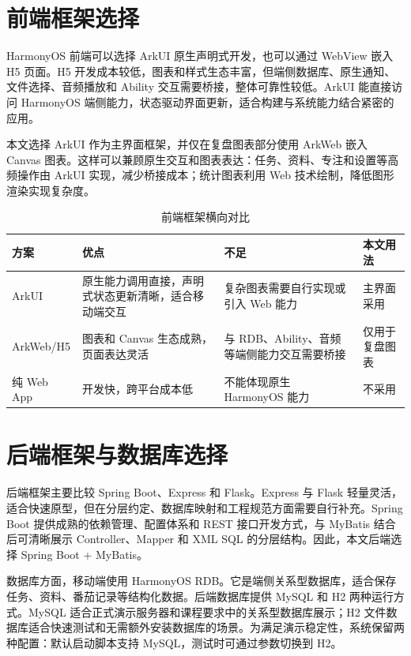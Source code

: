 \section{前端框架选择}

HarmonyOS 前端可以选择 ArkUI 原生声明式开发，也可以通过 WebView 嵌入 H5 页面。H5 开发成本较低，图表和样式生态丰富，但端侧数据库、原生通知、文件选择、音频播放和 Ability 交互需要桥接，整体可靠性较低。ArkUI 能直接访问 HarmonyOS 端侧能力，状态驱动界面更新，适合构建与系统能力结合紧密的应用。

本文选择 ArkUI 作为主界面框架，并仅在复盘图表部分使用 ArkWeb 嵌入 Canvas 图表。这样可以兼顾原生交互和图表表达：任务、资料、专注和设置等高频操作由 ArkUI 实现，减少桥接成本；统计图表利用 Web 技术绘制，降低图形渲染实现复杂度。

\begin{table}[htbp]
\centering
\caption{前端框架横向对比}
\begin{tabularx}{\textwidth}{p{2.2cm}X X p{2.4cm}}
\toprule
方案 & 优点 & 不足 & 本文用法 \\
\midrule
ArkUI & 原生能力调用直接，声明式状态更新清晰，适合移动端交互 & 复杂图表需要自行实现或引入 Web 能力 & 主界面采用 \\
ArkWeb/H5 & 图表和 Canvas 生态成熟，页面表达灵活 & 与 RDB、Ability、音频等端侧能力交互需要桥接 & 仅用于复盘图表 \\
纯 Web App & 开发快，跨平台成本低 & 不能体现原生 HarmonyOS 能力 & 不采用 \\
\bottomrule
\end{tabularx}
\end{table}

\section{后端框架与数据库选择}

后端框架主要比较 Spring Boot、Express 和 Flask。Express 与 Flask 轻量灵活，适合快速原型，但在分层约定、数据库映射和工程规范方面需要自行补充。Spring Boot 提供成熟的依赖管理、配置体系和 REST 接口开发方式，与 MyBatis 结合后可清晰展示 Controller、Mapper 和 XML SQL 的分层结构。因此，本文后端选择 Spring Boot + MyBatis。

数据库方面，移动端使用 HarmonyOS RDB。它是端侧关系型数据库，适合保存任务、资料、番茄记录等结构化数据。后端数据库提供 MySQL 和 H2 两种运行方式。MySQL 适合正式演示服务器和课程要求中的关系型数据库展示；H2 文件数据库适合快速测试和无需额外安装数据库的场景。为满足演示稳定性，系统保留两种配置：默认启动脚本支持 MySQL，测试时可通过参数切换到 H2。

